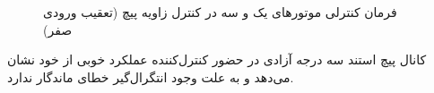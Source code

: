 \begin{figure}[H]
	\centering
	
	\caption{‫‪فرمان کنترلی موتورهای یک و سه در کنترل زاویه پیچ (تعقیب ورودی صفر)}
\end{figure}
کانال پیچ استند سه درجه آزادی در حضور کنترل‌کننده  عملکرد خوبی از خود نشان می‌دهد و به علت وجود انتگرال‌گیر خطای ماندگار ندارد.



